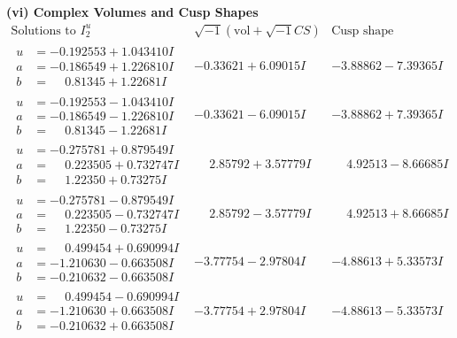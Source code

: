 \documentclass[1p]{elsarticle_modified}
\theoremstyle{definition}
\newcommand{\I}{\sqrt{-1}}
\begin{document}
\newpage\flushleft \textbf{(vi) Complex Volumes and Cusp Shapes}
$$\begin{array}{c|c|c}  
\text{Solutions to }I^u_{2}& \I (\text{vol} + \sqrt{-1}CS) & \text{Cusp shape}\\
 \hline 
\begin{aligned}
u &= -0.192553 + 1.043410 I \\
a &= -0.186549 + 1.226810 I \\
b &= \phantom{-}0.81345 + 1.22681 I\end{aligned}
 & -0.33621 + 6.09015 I & -3.88862 - 7.39365 I \\ \hline\begin{aligned}
u &= -0.192553 - 1.043410 I \\
a &= -0.186549 - 1.226810 I \\
b &= \phantom{-}0.81345 - 1.22681 I\end{aligned}
 & -0.33621 - 6.09015 I & -3.88862 + 7.39365 I \\ \hline\begin{aligned}
u &= -0.275781 + 0.879549 I \\
a &= \phantom{-}0.223505 + 0.732747 I \\
b &= \phantom{-}1.22350 + 0.73275 I\end{aligned}
 & \phantom{-}2.85792 + 3.57779 I & \phantom{-}4.92513 - 8.66685 I \\ \hline\begin{aligned}
u &= -0.275781 - 0.879549 I \\
a &= \phantom{-}0.223505 - 0.732747 I \\
b &= \phantom{-}1.22350 - 0.73275 I\end{aligned}
 & \phantom{-}2.85792 - 3.57779 I & \phantom{-}4.92513 + 8.66685 I \\ \hline\begin{aligned}
u &= \phantom{-}0.499454 + 0.690994 I \\
a &= -1.210630 - 0.663508 I \\
b &= -0.210632 - 0.663508 I\end{aligned}
 & -3.77754 - 2.97804 I & -4.88613 + 5.33573 I \\ \hline\begin{aligned}
u &= \phantom{-}0.499454 - 0.690994 I \\
a &= -1.210630 + 0.663508 I \\
b &= -0.210632 + 0.663508 I\end{aligned}
 & -3.77754 + 2.97804 I & -4.88613 - 5.33573 I \\ \hline\begin{aligned}

\end{aligned}
\end{array}$$
\end{document}
